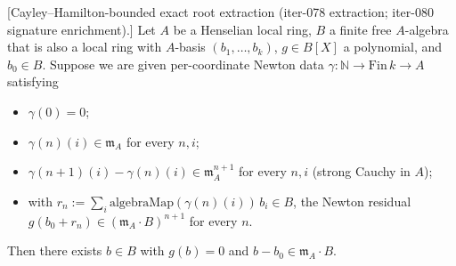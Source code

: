 \begin{lemma}
\label{lem:henselianPair-l3c-root-descent-from-mAB2-charpoly-bound}
\leanok
{}
[Cayley--Hamilton-bounded exact root extraction
(iter-078 extraction; iter-080 signature enrichment).]
Let $A$ be a Henselian local ring, $B$ a finite free $A$-algebra
that is also a local ring with $A$-basis $(b_1, \ldots, b_k)$,
$g \in B[X]$ a polynomial, and $b_0 \in B$. Suppose we are given
per-coordinate Newton data $\gamma : \mathbb N \to \mathrm{Fin}\,k
\to A$ satisfying
\begin{itemize}
\item $\gamma(0) = 0$;
\item $\gamma(n)(i) \in \mathfrak m_A$ for every $n, i$;
\item $\gamma(n+1)(i) - \gamma(n)(i) \in \mathfrak m_A^{n+1}$ for
every $n, i$ (strong Cauchy in $A$);
\item with $r_n := \sum_i \mathrm{algebraMap}(\gamma(n)(i))\,b_i
\in B$, the Newton residual
$g(b_0 + r_n) \in (\mathfrak m_A \cdot B)^{n+1}$ for every $n$.
\end{itemize}
Then there exists $b \in B$ with $g(b) = 0$ and
$b - b_0 \in \mathfrak m_A \cdot B$.
\end{lemma}

